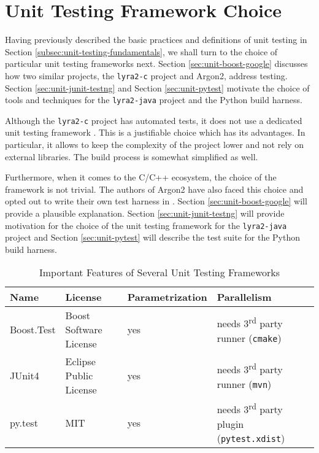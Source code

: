 \chapter{Unit Testing Framework Choice}
\label{sec:unit-testing-framework-choice}

Having previously described the basic practices and definitions of unit testing in Section \ref{subsec:unit-testing-fundamentals}, we shall turn to the choice of particular unit testing frameworks next. Section \ref{sec:unit-boost-google} discusses how two similar projects, the \texttt{lyra2-c} project and Argon2, address testing. Section \ref{sec:unit-junit-testng} and Section \ref{sec:unit-pytest} motivate the choice of tools and techniques for the \texttt{lyra2-java} project and the Python build harness.

Although the \texttt{lyra2-c} project has automated tests, it does not use a dedicated unit testing framework \cite{github:2017:lyra}. This is a justifiable choice which has its advantages. In particular, it allows to keep the complexity of the project lower and not rely on external libraries. The build process is somewhat simplified as well.

Furthermore, when it comes to the C/C++ ecosystem, the choice of the framework is not trivial. The authors of Argon2 have also faced this choice and opted out to write their own test harness in \cite{github:2017:argon2-test.c}. Section \ref{sec:unit-boost-google} will provide a plausible explanation. Section \ref{sec:unit-junit-testng} will provide motivation for the choice of the unit testing framework for the \texttt{lyra2-java} project and Section \ref{sec:unit-pytest} will describe the test suite for the Python build harness.

\begin{table}
\begin{tabular}{llll}
    Name & License & Parametrization & Parallelism \\ \hline
Boost.Test & Boost Software License & yes & needs 3\textsuperscript{rd} party runner (\texttt{cmake}) \\
JUnit4 & Eclipse Public License & yes & needs 3\textsuperscript{rd} party runner (\texttt{mvn}) \\
py.test & MIT & yes & needs 3\textsuperscript{rd} party plugin (\texttt{pytest.xdist})
\end{tabular}
\caption{Important Features of Several Unit Testing Frameworks}
\label{table:framework-features-cpp}
\end{table}

